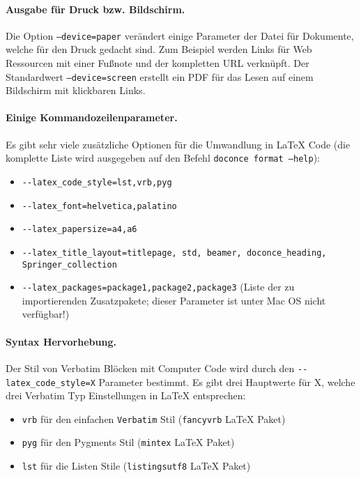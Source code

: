 \documentclass[%
oneside,                 %
final,                   %
chapterprefix=true,      %
open=right,              %
10pt]{book}
\begin{document}
\paragraph{ Ausgabe für Druck bzw. Bildschirm.}
Die Option \texttt{--device=paper} verändert einige Parameter der Datei für Dokumente, welche für den Druck gedacht sind. Zum Beispiel werden Links für Web Ressourcen mit einer Fußnote und der kompletten URL verknüpft. Der Standardwert \texttt{--device=screen} erstellt ein PDF für das Lesen auf einem Bildschirm mit klickbaren Links.
\paragraph{ Einige Kommandozeilenparameter.}
Es gibt sehr viele zusätzliche Optionen für die Umwandlung in {\LaTeX} Code (die komplette Liste wird ausgegeben auf den Befehl \texttt{doconce format --help}):
\begin{itemize}
\item \Verb!--latex_code_style=lst,vrb,pyg!

\item \Verb!--latex_font=helvetica,palatino!

\item \Verb!--latex_papersize=a4,a6!

\item \Verb!--latex_title_layout=titlepage, std, beamer, doconce_heading, Springer_collection!

\item \Verb!--latex_packages=package1,package2,package3! (Liste der zu importierenden Zusatzpakete; dieser Parameter ist unter Mac OS nicht verfügbar!)
\end{itemize}

\noindent
\paragraph{ Syntax Hervorhebung.}
Der Stil von Verbatim Blöcken mit Computer Code wird durch den \Verb!--latex_code_style=X! Parameter bestimmt. Es gibt drei Hauptwerte für X, welche drei Verbatim Typ Einstellungen in {\LaTeX} entsprechen:
\begin{itemize}
\item \texttt{vrb} für den einfachen \texttt{Verbatim} Stil (\texttt{fancyvrb} {\LaTeX} Paket)

\item \texttt{pyg} für den Pygments Stil (\texttt{mintex} {\LaTeX} Paket)

\item \texttt{lst} für die Listen Stile (\texttt{listingsutf8} {\LaTeX} Paket)
\end{itemize}
\end{document}
